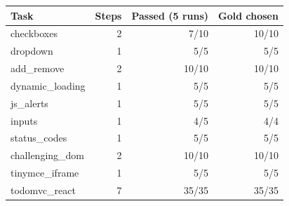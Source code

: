 \begin{tabular}{lrrr}
\toprule
Task & Steps & Passed (5 runs) & Gold chosen \\
\midrule
checkboxes & 2 & 7/10 & 10/10 \\
dropdown & 1 & 5/5 & 5/5 \\
add\_remove & 2 & 10/10 & 10/10 \\
dynamic\_loading & 1 & 5/5 & 5/5 \\
js\_alerts & 1 & 5/5 & 5/5 \\
inputs & 1 & 4/5 & 4/4 \\
status\_codes & 1 & 5/5 & 5/5 \\
challenging\_dom & 2 & 10/10 & 10/10 \\
tinymce\_iframe & 1 & 5/5 & 5/5 \\
todomvc\_react & 7 & 35/35 & 35/35 \\
\bottomrule
\end{tabular}
